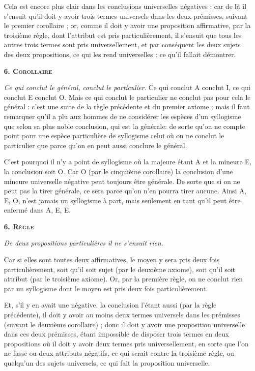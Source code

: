 Cela est encore plus clair dans les conclusions universelles négatives ; car de là il s'ensuit qu'il doit y avoir trois termes universels dans les deux prémisses, suivant le premier corollaire ; or, comme il doit y avoir une proposition affirmative, par la troisième règle, dont l'attribut est pris particulièrement, il s'ensuit que tous les autres trois termes sont pris universellement, et par conséquent les deux sujets des deux propositions, ce qui les rend universelles : ce qu'il fallait démontrer.

\begin{center}{\bfseries\scshape 6. Corollaire}\end{center}

\emph{Ce qui conclut le général, conclut le particulier}. Ce qui conclut A conclut I, ce qui conclut E conclut O. Mais ce qui conclut le particulier ne conclut pas pour cela le général : c'est une suite de la règle précédente et du premier axiome ; mais il faut remarquer qu'il a plu aux hommes de ne considérer les espèces d'un syllogisme que selon sa plus noble conclusion, qui est la générale: de sorte qu'on ne compte point pour une espèce particulière de syllogisme celui où on ne conclut le particulier que parce qu'on en peut aussi conclure le général.

C'est pourquoi il n'y a point de syllogisme où la majeure étant A et la mineure E, la conclusion soit O. Car O (par le cinquième corollaire) la conclusion d'une mineure universelle négative peut toujours être générale. De sorte que si on ne peut pas la tirer générale, ce sera parce qu'on n'en pourra tirer aucune. Ainsi A, E, O, n'est jamais un syllogisme à part, mais seulement en tant qu'il peut être enfermé dans A, E, E.

\begin{center}{\bfseries\scshape\large 6. Règle}\end{center}

	\emph{De deux propositions particulières il ne s'ensuit rien.}

Car si elles sont toutes deux affirmatives, le moyen y sera pris deux fois particulièrement, soit qu'il soit sujet (par le deuxième axiome), soit qu'il soit attribut (par le troisième axiome). Or, par la première règle, on ne conclut rien par un syllogisme dont le moyen est pris deux fois particulièrement.

Et, s'il y en avait une négative, la conclusion l'étant aussi (par la règle précédente), il doit y avoir au moins deux termes universels dans les prémisses (suivant le deuxième corollaire) ; donc il doit y avoir une proposition universelle dans ces deux prémisses, étant impossible de disposer trois termes en deux propositions où il doit y avoir deux termes pris universellement, en sorte que l'on ne fasse ou deux attributs négatifs, ce qui serait contre la troisième règle, ou quelqu'un des sujets universels, ce qui fait la proposition universelle.


